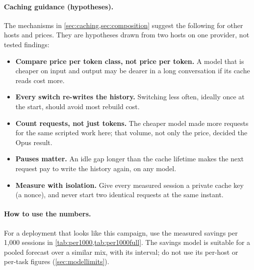 \paragraph{Caching guidance (hypotheses).} The mechanisms in \cref{sec:caching,sec:composition} suggest the
following for other hosts and prices. They are hypotheses drawn from two hosts on one provider, not tested
findings:
\begin{itemize}
  \item \textbf{Compare price per token class, not price per token.} A model that is cheaper on input and
    output may be dearer in a long conversation if its cache reads cost more.
  \item \textbf{Every switch re-writes the history.} Switching less often, ideally once at the start, should
    avoid most rebuild cost.
  \item \textbf{Count requests, not just tokens.} The cheaper model made more requests for the same scripted
    work here; that volume, not only the price, decided the Opus result.
  \item \textbf{Pauses matter.} An idle gap longer than the cache lifetime makes the next request pay to
    write the history again, on any model.
  \item \textbf{Measure with isolation.} Give every measured session a private cache key (a nonce), and never
    start two identical requests at the same instant.
\end{itemize}

\paragraph{How to use the numbers.} For a deployment that looks like this campaign, use the measured savings
per 1,000 sessions in \cref{tab:per1000,tab:per1000full}. The savings model is suitable for a pooled
forecast over a similar mix, with its interval; do not use its per-host or per-task figures
(\cref{sec:modellimits}).


